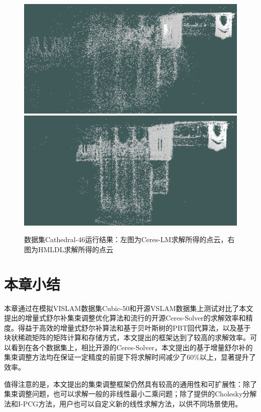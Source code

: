 \begin{figure}[htb!]
    \centering
    \includegraphics[width=.45\textwidth]{Pictures/cathedral_ceres.png}
    \includegraphics[width=.45\textwidth]{Pictures/cathedral_spec3.png}
    \caption{数据集Cathedral-46运行结果：左图为Ceres-LM求解所得的点云，右图为HMLDL求解所得的点云}
    \label{fig:cathedral}
\end{figure}

\section{本章小结}

本章通过在模拟VISLAM数据集Cubic-50和开源VSLAM数据集上测试对比了本文提出的增量式舒尔补集束调整优化算法和流行的开源Ceres-Solver的求解效率和精度。得益于高效的增量式舒尔补算法和基于贝叶斯树的PBT回代算法，以及基于块状稀疏矩阵的矩阵计算和存储方式，本文提出的框架达到了较高的求解效率。可以看到在各个数据集上，相比开源的Ceres-Solver，本文提出的基于增量舒尔补的集束调整方法均在保证一定精度的前提下将求解时间减少了$60\%$以上，显著提升了效率。

值得注意的是，本文提出的集束调整框架仍然具有较高的通用性和可扩展性：除了集束调整问题，也可以求解一般的非线性最小二乘问题；除了提供的Cholesky分解法和I-PCG方法，用户也可以自定义新的线性求解方法，以供不同场景使用。
